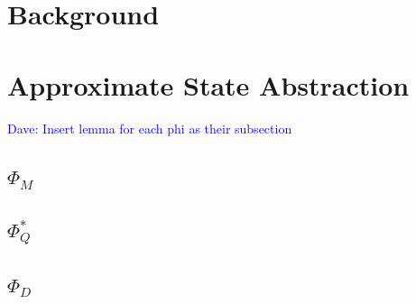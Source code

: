 \documentclass{article}
\newcommand\dnote[1]{\textcolor{blue}{Dave: #1}}
\begin{document}









\section{Background}







\section{Approximate State Abstraction}




\dnote{Insert lemma for each phi as their subsection}


\subsection{$\Phi_M$}


\subsection{$\Phi_Q^*$}


\subsection{$\Phi_D$}
\end{document}
